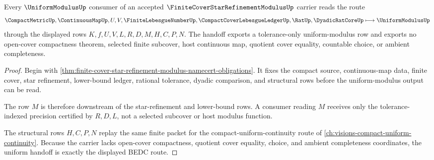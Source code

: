 \begin{theorem}
\label{thm:finite-cover-star-refinement-modulus-uniform-handoff}
Every $\UniformModulusUp$ consumer of an accepted $\FiniteCoverStarRefinementModulusUp$ carrier reads the route
$$
\CompactMetricUp,\ContinuousMapUp,U,V,\FiniteLebesgueNumberUp,\CompactCoverLebesgueLedgerUp,\RatUp,\DyadicRatCoreUp \longmapsto \UniformModulusUp
$$
through the displayed rows $K,f,U,V,L,R,D,M,H,C,P,N$. The handoff exports a tolerance-only uniform-modulus row and exports no open-cover compactness theorem, selected finite subcover, host continuous map, quotient cover equality, countable choice, or ambient completeness.
\end{theorem}
\begin{proof}
Begin with \autoref{thm:finite-cover-star-refinement-modulus-namecert-obligations}. It fixes the compact source, continuous-map data, finite cover, star refinement, lower-bound ledger, rational tolerance, dyadic comparison, and structural rows before the uniform-modulus output can be read.

The row $M$ is therefore downstream of the star-refinement and lower-bound rows. A consumer reading $M$ receives only the tolerance-indexed precision certified by $R,D,L$, not a selected subcover or host modulus function.

The structural rows $H,C,P,N$ replay the same finite packet for the compact-uniform-continuity route of \autoref{ch:visions-compact-uniform-continuity}. Because the carrier lacks open-cover compactness, quotient cover equality, choice, and ambient completeness coordinates, the uniform handoff is exactly the displayed BEDC route.
\end{proof}




